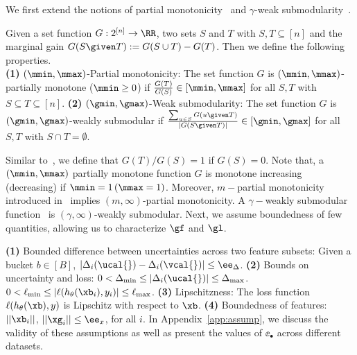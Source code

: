 \documentclass[letterpaper]{article}
\renewcommand{\cite}{\citep}
\begin{document}
We first extend the   notions of  partial monotonicity~\cite{mualem2022using}
and $\gamma$-weak submodularity~\cite{elenberg2018restricted,harshaw2019submodular}.
\begin{definition}
 Given a set function $G:2^{[n]} \to \RR $, two sets $S$ and $T$ with $S,T \subseteq [n]$ and the marginal gain $G(S\given T):= G(S\cup T) - G(T)$. Then we define the following properties.\\
\textbf{ (1)} $(\mmin,\mmax)$-Partial monotonicity: The set function $G$ is $(\mmin,\mmax)$-partially monotone ($\mmin \ge 0$)  if $\frac{G(T)}{G(S)} \in [\mmin,\mmax]$ for all $S,T$ with $S\subseteq T \subseteq [n]$.
 \textbf{ (2)} $(\gmin,\gmax)$-Weak submodularity: The set function $G$ is $(\gmin,\gmax)$-weakly submodular  if $\frac{\sum_{u\in S}G(u\given T)}{|G(S\given T)|} \in [\gmin,\gmax]$ for all $S,T$ with $S\cap T = \emptyset$.
\end{definition}
Similar to~\citet{mualem2022using}, we define that $G(T)/G(S)=1$ if $G(S) = 0$. Note that,  a $(\mmin,\mmax)$ partially monotone function $G$ is monotone increasing (decreasing) if $\mmin = 1\, (\mmax =1)$. Moreover,  $m-$partial monotonicity introduced in~\cite{mualem2022using} implies $(m,\infty)$-partial monotonicity. A $\gamma-$weakly submodular function~\cite{elenberg2018restricted,harshaw2019submodular} is $(\gamma,\infty)$-weakly submodular. Next, we assume  boundedness of few quantities, allowing us to characterize $\gf$ and $\gl$.
\begin{assumption}
\label{assumption}
\textbf{(1)} Bounded difference between uncertainties across two feature subsets:
Given a bucket $b\in [B]$, $|\Delta_i(\ucal{}) - \Delta_i(\vcal{})| \le \ee_{\Delta}$.
\textbf{(2)} Bounds on uncertainty and loss:
$0< \Delta_{\min} \le |\Delta_i(\ucal{})| \le \Delta_{\max} $.
$ 0< \ell_{\min} \le |\ell(h_\theta(\xb_i),y_i)| \le \ell_{\max}$.
\textbf{(3)} Lipschitzness: The loss function $\ell(h_\theta(\xb),y)$ is Lipschitz with respect to $\xb$. \textbf{(4)} Boundedness of features: $||\xb_i||$, $||\xg_i|| \le \ee_x$, for all $i$.
In Appendix~\ref{app:assump}, we discuss the validity of these assumptions as well as present the values of $\ee_\bullet$ across different datasets.
\end{assumption}
\end{document}

